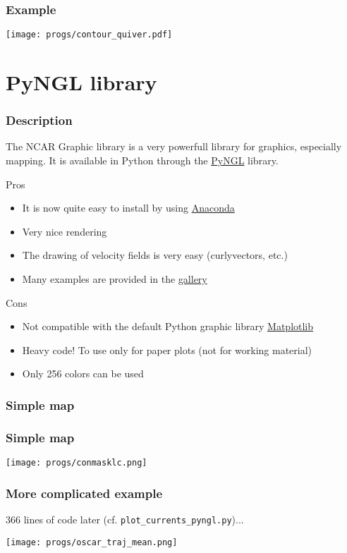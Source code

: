 \documentclass{beamer}
\begin{document}
\begin{frame}[fragile]
\frametitle{Example}
    \begin{center}
        \texttt{[image: progs/contour\_quiver.pdf]}
    \end{center}
\end{frame}


\section{PyNGL library}

\begin{frame}[fragile]
\frametitle{Description}
    The NCAR Graphic library is a very powerfull library for graphics, especially mapping. It is available in Python through the \textcolor{blue}{\href{https://www.pyngl.ucar.edu/}{PyNGL}} library.
    \footnotesize{
\begin{block}{Pros}
    \begin{itemize}
        \item{It is now quite easy to install by using \href{https://www.anaconda.com/}{Anaconda}}
        \item{Very nice rendering}
        \item{The drawing of velocity fields is very easy (curlyvectors, etc.)}
        \item{Many examples are provided in the \href{https://www.pyngl.ucar.edu/Examples/gallery.shtml}{gallery}}
    \end{itemize}
\end{block}
\begin{alertblock}{Cons}
    \begin{itemize}
        \item{Not compatible with the default Python graphic library \href{https://matplotlib.org/}{Matplotlib}}
        \item{Heavy code! To use only for paper plots (not for working material)}
        \item{Only 256 colors can be used}
    \end{itemize}
\end{alertblock}
}
\end{frame}

\begin{frame}[fragile]
\frametitle{Simple map}

\end{frame}

\begin{frame}[fragile]
\frametitle{Simple map}
    \begin{center}
    \texttt{[image: progs/conmasklc.png]}
    \end{center}
\end{frame}

\begin{frame}[fragile]
\frametitle{More complicated example}
    366 lines of code later (cf. \verb+plot_currents_pyngl.py+)...
    \begin{center}
    \texttt{[image: progs/oscar\_traj\_mean.png]}
    \end{center}
\end{frame}
\end{document}
